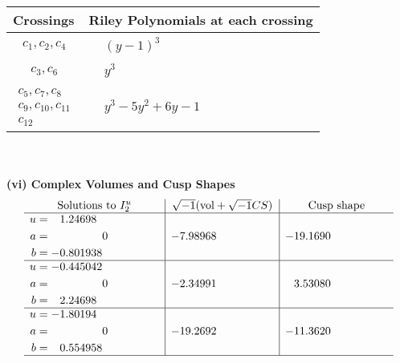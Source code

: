 \documentclass[1p]{elsarticle_modified}
\theoremstyle{definition}
\newcommand{\I}{\sqrt{-1}}
\begin{document}
\begin{tabular}{m{50pt}|m{274pt}}
Crossings & \hspace{64pt}Riley Polynomials at each crossing \\
\hline $$\begin{aligned}c_{1},c_{2},c_{4}\end{aligned}$$&$\begin{aligned}
&(y-1)^3
\end{aligned}$\\
\hline $$\begin{aligned}c_{3},c_{6}\end{aligned}$$&$\begin{aligned}
&y^3
\end{aligned}$\\
\hline $$\begin{aligned}c_{5},c_{7},c_{8}\\c_{9},c_{10},c_{11}\\c_{12}\end{aligned}$$&$\begin{aligned}
&y^3-5 y^2+6 y-1
\end{aligned}$\\
\hline
\end{tabular}\\~\\
\newpage\flushleft \textbf{(vi) Complex Volumes and Cusp Shapes}
$$\begin{array}{c|c|c}  
\text{Solutions to }I^u_{2}& \I (\text{vol} + \sqrt{-1}CS) & \text{Cusp shape}\\
 \hline 
\begin{aligned}
u &= \phantom{-}1.24698\phantom{ +0.000000I} \\
a &= \phantom{-0.000000 } 0 \\
b &= -0.801938\phantom{ +0.000000I}\end{aligned}
 & -7.98968\phantom{ +0.000000I} & -19.1690\phantom{ +0.000000I} \\ \hline\begin{aligned}
u &= -0.445042\phantom{ +0.000000I} \\
a &= \phantom{-0.000000 } 0 \\
b &= \phantom{-}2.24698\phantom{ +0.000000I}\end{aligned}
 & -2.34991\phantom{ +0.000000I} & \phantom{-}3.53080\phantom{ +0.000000I} \\ \hline\begin{aligned}
u &= -1.80194\phantom{ +0.000000I} \\
a &= \phantom{-0.000000 } 0 \\
b &= \phantom{-}0.554958\phantom{ +0.000000I}\end{aligned}
 & -19.2692\phantom{ +0.000000I} & -11.3620\phantom{ +0.000000I}\\
 \hline 
 \end{array}$$\newpage\newpage\renewcommand{\arraystretch}{1}
\end{document}

